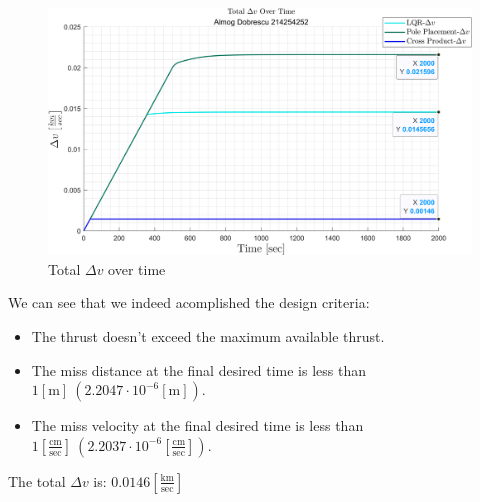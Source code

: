 \documentclass[11pt, a4paper]{article}
\begin{document}
\begin{figure}[H]
    \centering
    \includegraphics[width=1\textwidth]{images/graph4.png}
    \caption{Total $\Delta v$ over time}
    \label{fig:delta_v_over_time}
\end{figure}
We can see that we indeed acomplished the design criteria:
\begin{itemize}
    \item The thrust doesn't exceed the maximum available thrust.
    \item The miss distance at the final desired time is less than $1[\mathrm{m}]\ \left(2.2047\cdot10^{-6}\left[\mathrm{m}\right]\right)$.
    \item The miss velocity at the final desired time is less than $1\left[\displaystyle\frac{\mathrm{cm}}{\mathrm{sec}}\right]\ \left(2.2037\cdot10^{-6}\left[\displaystyle\frac{\mathrm{cm}}{\mathrm{sec}}\right]\right)$.
\end{itemize}

The total $\Delta v$ is: $0.0146\left[\displaystyle\frac{\mathrm{km}}{\mathrm{sec}}\right]$
\end{document}
